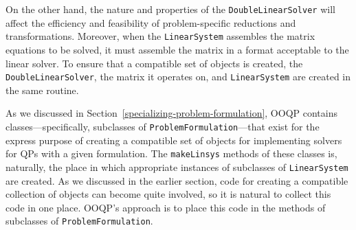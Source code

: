On the other hand, the nature and properties of the
\texttt{DoubleLinearSolver} will affect the efficiency and feasibility
of problem-specific reductions and transformations.  Moreover, when
the \texttt{LinearSystem} assembles the matrix equations to be solved,
it must assemble the matrix in a format acceptable to the linear
solver. To ensure that a compatible set of objects is created, the
\texttt{DoubleLinearSolver}, the matrix it operates on, and
\texttt{LinearSystem} are created in the same routine.

As we discussed in Section~\ref{specializing-problem-formulation}, OOQP
contains classes---specifically, subclasses of
\texttt{ProblemFormulation}---that exist for the express purpose of
creating a compatible set of objects for implementing solvers for QPs
with a given formulation. The \texttt{makeLinsys} methods of these
classes is, naturally, the place in which appropriate instances of
subclasses of \texttt{LinearSystem} are created. As we discussed in
the earlier section, code for creating a compatible collection of
objects can become quite involved, so it is natural to collect this
code in one place. OOQP's approach is to place this code in the
methods of subclasses of \texttt{ProblemFormulation}.

